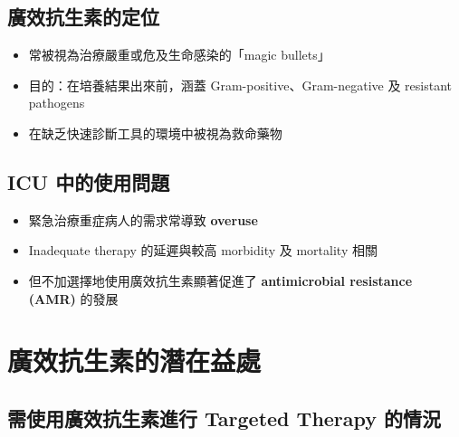\documentclass[12pt,a4paper]{article}
\begin{document}
\subsection{廣效抗生素的定位}

\begin{itemize}
    \item 常被視為治療嚴重或危及生命感染的「magic bullets」
    \item 目的：在培養結果出來前，涵蓋 Gram-positive、Gram-negative 及 resistant pathogens
    \item 在缺乏快速診斷工具的環境中被視為救命藥物
\end{itemize}

\subsection{ICU 中的使用問題}

\begin{itemize}
    \item 緊急治療重症病人的需求常導致 \textbf{overuse}
    \item Inadequate therapy 的延遲與較高 morbidity 及 mortality 相關
    \item 但不加選擇地使用廣效抗生素顯著促進了 \textbf{antimicrobial resistance (AMR)} 的發展
\end{itemize}

\section{廣效抗生素的潛在益處}


\subsection{需使用廣效抗生素進行 Targeted Therapy 的情況}
\end{document}
